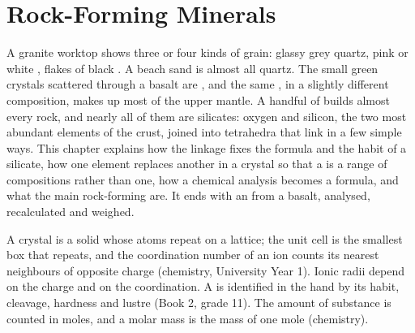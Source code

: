 \chapter{Rock-Forming Minerals}\label{ch:b1:rock-forming-minerals}

A granite worktop shows three or four kinds of grain: glassy grey quartz, pink
or white , flakes of black . A beach sand is almost all quartz.
The small green crystals scattered through a basalt are , and the same
, in a slightly different composition, makes up most of the upper
mantle. A handful of  builds almost every rock, and nearly all of them
are silicates: oxygen and silicon, the two most abundant elements of the
crust, joined into tetrahedra that link in a few simple ways. This chapter
explains how the linkage fixes the formula and the habit of a silicate, how
one element replaces another in a crystal so that a  is a range of
compositions rather than one, how a chemical analysis becomes a formula, and
what the main rock-forming  are. It ends with an  from a
basalt, analysed, recalculated and weighed.

\begin{recall}
A crystal is a solid whose atoms repeat on a lattice; the unit cell is the
smallest box that repeats, and the coordination number of an ion counts its
nearest neighbours of opposite charge (chemistry, University Year 1). Ionic
radii depend on the charge and on the coordination. A  is identified in
the hand by its habit, cleavage, hardness and lustre (Book 2, grade 11). The
amount of substance is counted in moles, and a molar mass is the mass of one
mole (chemistry).
\end{recall}

